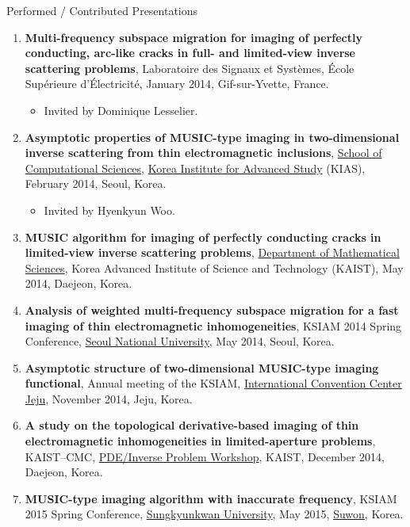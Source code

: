 \documentclass{resume} %
\begin{document}
\begin{rSection}{Performed / Contributed Presentations}
\begin{enumerate}
\item\label{P-SUPELEC2014B} \textbf{Multi-frequency subspace migration for imaging of perfectly conducting, arc-like cracks in full- and limited-view inverse scattering problems}, Laboratoire des Signaux et Syst\`emes, \'Ecole Sup\'erieure d'\'Electricit\'e, January 2014, Gif-sur-Yvette, France.
\begin{itemize}
\item Invited by Dominique Lesselier.
\end{itemize}
\item\label{P-KIAS2014} \textbf{Asymptotic properties of MUSIC-type imaging in two-dimensional inverse scattering from thin electromagnetic inclusions}, \href{http://www.kias.re.kr/sub03/sub03_03_01.jsp}{School of Computational Sciences}, \href{http://www.kias.re.kr/main/main.jsp}{Korea Institute for Advanced Study} (KIAS), February 2014, Seoul, Korea.
\begin{itemize}
\item Invited by Hyenkyun Woo.
\end{itemize}
\item\label{P-KAIST2014} \textbf{MUSIC algorithm for imaging of perfectly conducting cracks in limited-view inverse scattering problems}, \href{http://mathsci.kaist.ac.kr/home/}{Department of Mathematical Sciences}, Korea Advanced Institute of Science and Technology (KAIST), May 2014, Daejeon, Korea.
\item\label{P-KSIAM2014A} \textbf{Analysis of weighted multi-frequency subspace migration for a fast imaging of thin electromagnetic inhomogeneities}, KSIAM 2014 Spring Conference, \href{http://www.snu.ac.kr}{Seoul National University}, May 2014, Seoul, Korea.
\item\label{P-KSIAM2014B} \textbf{Asymptotic structure of two-dimensional MUSIC-type imaging functional}, Annual meeting of the KSIAM, \href{http://www.iccjeju.co.kr/}{International Convention Center Jeju}, November 2014, Jeju, Korea.
\item\label{P-CMC2014} \textbf{A study on the topological derivative-based imaging of thin electromagnetic inhomogeneities in limited-aperture problems}, KAIST--CMC, \href{http://home.kias.re.kr/MKG/h/KCMCPDE2014/?pageNo=1103}{PDE/Inverse Problem Workshop}, KAIST, December 2014, Daejeon, Korea.
\item\label{P-KSIAM2015A} \textbf{MUSIC-type imaging algorithm with inaccurate frequency}, KSIAM 2015 Spring Conference, \href{http://www.skku.edu/}{Sungkyunkwan University}, May 2015, \href{https://www.suwon.go.kr/intro.jsp}{Suwon}, Korea.

\end{enumerate}
\end{rSection}
\end{document}
